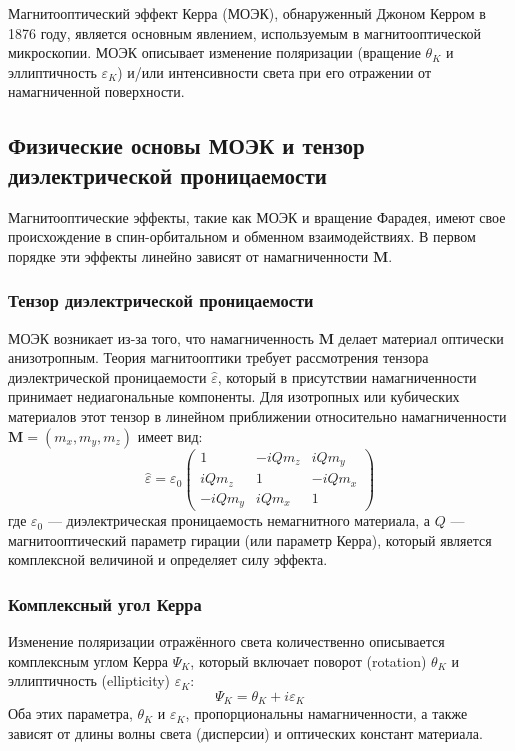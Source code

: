 \documentclass[12pt,a4paper]{article}
\numberwithin{equation}{section}
\begin{document}
Магнитооптический эффект Керра (МОЭК), обнаруженный Джоном Керром в 1876 году, является основным явлением, используемым в магнитооптической микроскопии. МОЭК описывает изменение поляризации (вращение $\theta_K$ и эллиптичность $\varepsilon_K$) и/или интенсивности света при его отражении от намагниченной поверхности.

\subsection{Физические основы МОЭК и тензор диэлектрической проницаемости}

Магнитооптические эффекты, такие как МОЭК и вращение Фарадея, имеют свое происхождение в спин-орбитальном и обменном взаимодействиях. В первом порядке эти эффекты линейно зависят от намагниченности $\mathbf{M}$.

\subsubsection{Тензор диэлектрической проницаемости}
МОЭК возникает из-за того, что намагниченность $\mathbf{M}$ делает материал оптически анизотропным. Теория магнитооптики требует рассмотрения тензора диэлектрической проницаемости $\hat{\varepsilon}$, который в присутствии намагниченности принимает недиагональные компоненты. Для изотропных или кубических материалов этот тензор в линейном приближении относительно намагниченности $\mathbf{M} = (m_x, m_y, m_z)$ имеет вид:
$$
\hat{\varepsilon} = \varepsilon_0 \begin{pmatrix} 1 & -i Q m_z & i Q m_y \\ i Q m_z & 1 & -i Q m_x \\ -i Q m_y & i Q m_x & 1 \end{pmatrix}
$$
где $\varepsilon_0$ --- диэлектрическая проницаемость немагнитного материала, а $Q$ --- магнитооптический параметр гирации (или параметр Керра), который является комплексной величиной и определяет силу эффекта.

\subsubsection{Комплексный угол Керра}
Изменение поляризации отражённого света количественно описывается комплексным углом Керра $\Psi_K$, который включает поворот (rotation) $\theta_K$ и эллиптичность (ellipticity) $\varepsilon_K$:
$$
\Psi_K = \theta_K + i\varepsilon_K
$$
Оба этих параметра, $\theta_K$ и $\varepsilon_K$, пропорциональны намагниченности, а также зависят от длины волны света (дисперсии) и оптических констант материала.
\end{document}

